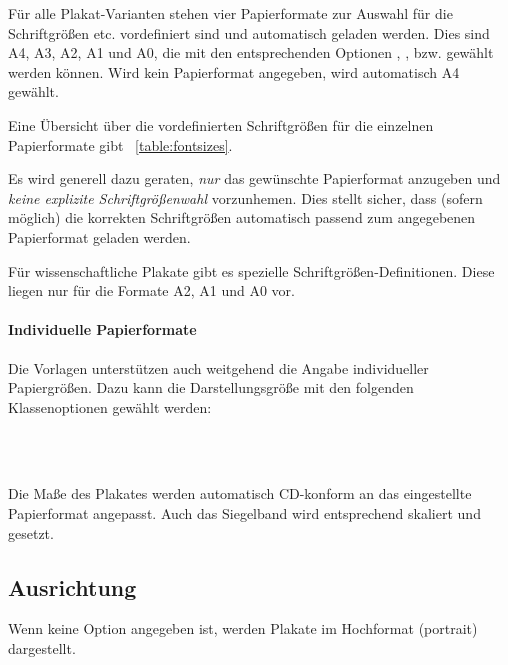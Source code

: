 Für alle Plakat-Varianten stehen vier Papierformate zur Auswahl für die
Schriftgrößen etc. vordefiniert sind und automatisch geladen werden.
Dies sind A4, A3, A2, A1 und A0, die mit den entsprechenden Optionen
, ,  bzw. 
gewählt werden können.
Wird kein Papierformat angegeben, wird automatisch A4 gewählt.

Eine Übersicht über die vordefinierten Schriftgrößen für die einzelnen
Papierformate gibt \tablename~\ref{table:fontsizes}.

\begin{hint}
Es wird generell dazu geraten, \emph{nur} das gewünschte Papierformat
anzugeben und \emph{keine explizite Schriftgrößenwahl} vorzunhemen.
Dies stellt sicher, dass (sofern möglich) die korrekten Schriftgrößen
automatisch passend zum angegebenen Papierformat geladen werden.
\end{hint}

\begin{hint}
  Für wissenschaftliche Plakate gibt es spezielle Schriftgrößen-Definitionen.
  Diese liegen nur für die Formate A2, A1 und A0 vor.
\end{hint}

\paragraph{Individuelle Papierformate}

Die Vorlagen unterstützen auch weitgehend die Angabe individueller Papiergrößen.
Dazu kann die Darstellungsgröße mit den folgenden Klassenoptionen
gewählt werden:
\begin{Declaration}
\\
\\
\end{Declaration}

Die Maße des Plakates werden automatisch CD-konform an das eingestellte
Papierformat angepasst.
Auch das Siegelband wird entsprechend skaliert und gesetzt. 

\subsection*{Ausrichtung}

Wenn keine Option angegeben ist, werden Plakate im Hochformat (portrait)
dargestellt.

